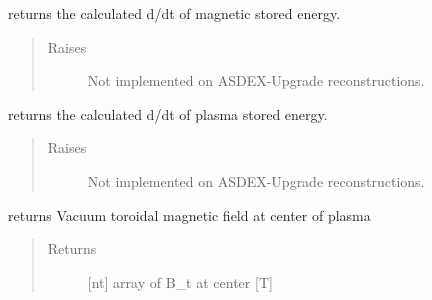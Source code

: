 \documentclass[letterpaper,10pt,english]{sphinxmanual}
\begin{document}
\begin{fulllineitems}
\begin{fulllineitems}
\begin{quote}
\begin{description}
\begin{itemize}
\end{itemize}

\end{description}\end{quote}

\end{fulllineitems}


\begin{fulllineitems}
\label{\detokenize{eqtools:eqtools.AUGData.AUGDDData.getWbdot}}
returns the calculated d/dt of magnetic stored energy.
\begin{quote}\begin{description}
\item[{Raises}] \leavevmode
{} \textendash{} Not implemented on ASDEX-Upgrade reconstructions.

\end{description}\end{quote}

\end{fulllineitems}


\begin{fulllineitems}
\label{\detokenize{eqtools:eqtools.AUGData.AUGDDData.getWpdot}}
returns the calculated d/dt of plasma stored energy.
\begin{quote}\begin{description}
\item[{Raises}] \leavevmode
{} \textendash{} Not implemented on ASDEX-Upgrade reconstructions.

\end{description}\end{quote}

\end{fulllineitems}


\begin{fulllineitems}
\label{\detokenize{eqtools:eqtools.AUGData.AUGDDData.getBCentr}}
returns Vacuum toroidal magnetic field at center of plasma
\begin{quote}\begin{description}
\item[{Returns}] \leavevmode
{[}nt{]} array of B\_t at center {[}T{]}


\end{description}
\end{quote}
\end{fulllineitems}
\end{fulllineitems}
\end{document}
